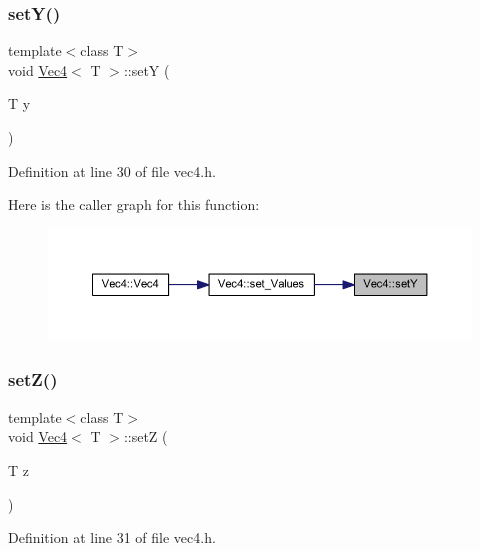 \subsubsection{\texorpdfstring{setY()}{setY()}}
{\footnotesize\ttfamily template$<$class T$>$ \\
void \mbox{\hyperlink{class_vec4}{Vec4}}$<$ T $>$\+::setY (\begin{DoxyParamCaption}\item[{T}]{y }\end{DoxyParamCaption})\hspace{0.3cm}{\ttfamily [inline]}}



Definition at line 30 of file vec4.\+h.

Here is the caller graph for this function\+:
\nopagebreak
\begin{figure}[H]
\begin{center}
\leavevmode
\includegraphics[width=350pt]{class_vec4_a61084f24df2d63808656dc0a038a0ed7_icgraph}
\end{center}
\end{figure}
\mbox{\label{class_vec4_aaa54409c9cea008742d4fd28a8a1b8d9}} 
\subsubsection{\texorpdfstring{setZ()}{setZ()}}
{\footnotesize\ttfamily template$<$class T$>$ \\
void \mbox{\hyperlink{class_vec4}{Vec4}}$<$ T $>$\+::setZ (\begin{DoxyParamCaption}\item[{T}]{z }\end{DoxyParamCaption})\hspace{0.3cm}{\ttfamily [inline]}}



Definition at line 31 of file vec4.\+h.


